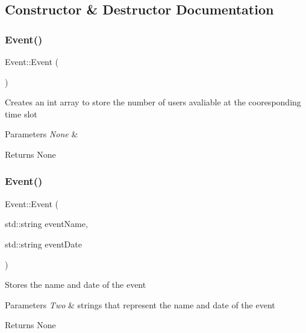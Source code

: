 \subsection{Constructor \& Destructor Documentation}
\mbox{\label{class_event_a5a40dd4708297f7031e29b39e039ae10}} 
\subsubsection{\texorpdfstring{Event()}{Event()}\hspace{0.1cm}{\footnotesize\ttfamily [1/2]}}
{\footnotesize\ttfamily Event\+::\+Event (\begin{DoxyParamCaption}{ }\end{DoxyParamCaption})}

Creates an int array to store the number of users avaliable at the cooresponding time slot 
\begin{DoxyParams}{Parameters}
{\em None} & \\
\hline
\end{DoxyParams}
\begin{DoxyReturn}{Returns}
None 
\end{DoxyReturn}
\mbox{\label{class_event_adcbdd318d0c3237e2e829549fd426d70}} 
\subsubsection{\texorpdfstring{Event()}{Event()}\hspace{0.1cm}{\footnotesize\ttfamily [2/2]}}
{\footnotesize\ttfamily Event\+::\+Event (\begin{DoxyParamCaption}\item[{std\+::string}]{event\+Name,  }\item[{std\+::string}]{event\+Date }\end{DoxyParamCaption})}

Stores the name and date of the event 
\begin{DoxyParams}{Parameters}
{\em Two} & strings that represent the name and date of the event \\
\hline
\end{DoxyParams}
\begin{DoxyReturn}{Returns}
None 
\end{DoxyReturn}


